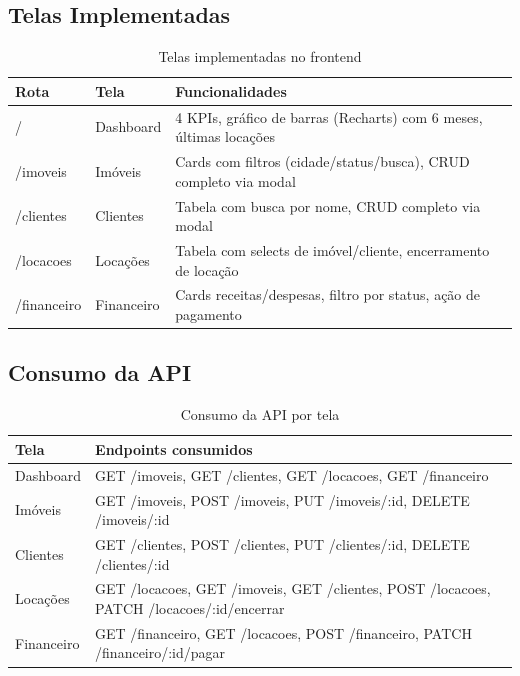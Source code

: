 \documentclass[12pt, a4paper]{article}
\newcommand{\thead}[1]{\cellcolor{tableheader}\color{white}\bfseries #1}
\newcommand{\talt}{\rowcolor{tablerowalt}}
\begin{document}
\subsection{Telas Implementadas}

\begin{table}[H]
\centering
\begin{tabularx}{\textwidth}{|l|l|X|}
\hline
\thead{Rota} & \thead{Tela} & \thead{Funcionalidades} \\
\hline
/           & Dashboard  & 4 KPIs, gráfico de barras (Recharts) com 6 meses, últimas locações \\
\talt /imoveis    & Imóveis    & Cards com filtros (cidade/status/busca), CRUD completo via modal \\
/clientes   & Clientes   & Tabela com busca por nome, CRUD completo via modal \\
\talt /locacoes   & Locações   & Tabela com selects de imóvel/cliente, encerramento de locação \\
/financeiro & Financeiro & Cards receitas/despesas, filtro por status, ação de pagamento \\
\hline
\end{tabularx}
\caption{Telas implementadas no frontend}
\end{table}

\subsection{Consumo da API}

\begin{table}[H]
\centering
\begin{tabularx}{\textwidth}{|l|X|}
\hline
\thead{Tela} & \thead{Endpoints consumidos} \\
\hline
Dashboard   & GET /imoveis, GET /clientes, GET /locacoes, GET /financeiro \\
\talt Imóveis    & GET /imoveis, POST /imoveis, PUT /imoveis/:id, DELETE /imoveis/:id \\
Clientes    & GET /clientes, POST /clientes, PUT /clientes/:id, DELETE /clientes/:id \\
\talt Locações   & GET /locacoes, GET /imoveis, GET /clientes, POST /locacoes, PATCH /locacoes/:id/encerrar \\
Financeiro  & GET /financeiro, GET /locacoes, POST /financeiro, PATCH /financeiro/:id/pagar \\
\hline
\end{tabularx}
\caption{Consumo da API por tela}
\end{table}
\end{document}
